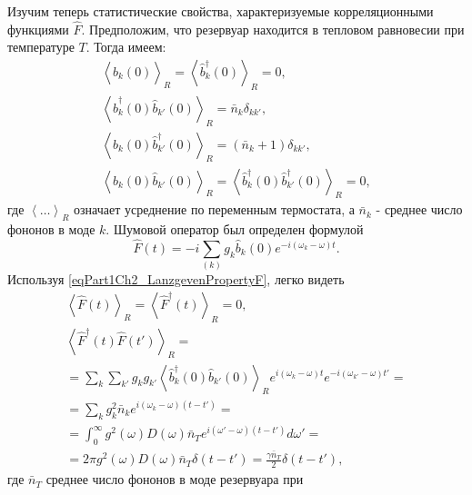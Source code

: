 Изучим теперь статистические свойства, характеризуемые корреляционными
функциями $\hat{F}$. Предположим, что резервуар находится в тепловом
равновесии при температуре $T$. Тогда имеем:
\begin{eqnarray}
\left<\hat{b}_k\left(0\right)\right>_R = 
\left<\hat{b}_k^{\dag}\left(0\right)\right>_R = 0, 
\nonumber \\
\left<\hat{b}_k^{\dag}\left(0\right)\hat{b}_{k'}\left(0\right)\right>_R = 
\bar{n}_k \delta_{k k'},
\nonumber \\
\left<\hat{b}_k\left(0\right)\hat{b}_{k'}^{\dag}\left(0\right)\right>_R = 
\left(\bar{n}_k + 1\right)\delta_{k k'},
\nonumber \\
\left<\hat{b}_k\left(0\right)\hat{b}_{k'}\left(0\right)\right>_R = 
\left<\hat{b}_k^{\dag}\left(0\right)\hat{b}_{k'}^{\dag}\left(0\right)\right>_R
= 0,
\label{eqPart1Ch2_LanzgevenPropertyF}
\end{eqnarray}
где $\left<\dots\right>_R$ означает усреднение по переменным
термостата, а $\bar{n}_k$ - среднее число фононов в моде $k$. Шумовой
оператор был определен формулой 
\begin{equation}
\hat{F}\left(t\right) = -i \sum_{(k)}g_k 
\hat{b}_k\left(0\right)
e^{-i \left(\omega_k - \omega\right)t}.
\label{eqPart1Ch2_LanzgevenDefenitionF}
\end{equation}
Используя \eqref{eqPart1Ch2_LanzgevenPropertyF}, легко видеть
\begin{eqnarray}
\left<\hat{F}\left(t\right)\right>_R =
\left<\hat{F}^{\dag}\left(t\right)\right>_R  = 0,
\nonumber \\
\left<\hat{F}^{\dag}\left(t\right)\hat{F}\left(t'\right)\right>_R = 
\nonumber \\
= \sum_{k}\sum_{k'}g_k g_{k'}
\left<\hat{b}_k^{\dag}\left(0\right)\hat{b}_{k'}\left(0\right)\right>_R 
e^{i\left(\omega_k - \omega\right)t} 
 e^{-i\left(\omega_{k'} - \omega\right)t'} =
\nonumber \\
= \sum_{k}g_k^2 \bar{n}_k 
e^{i\left(\omega_k - \omega\right)\left(t - t'\right)} = 
\nonumber \\
=
\int_0^\infty
g^2\left(\omega\right)D\left(\omega\right)\bar{n}_T
e^{i\left(\omega' - \omega\right)\left(t - t'\right)}d \omega' = 
\nonumber \\
= 2 \pi
g^2\left(\omega\right)D\left(\omega\right)\bar{n}_T
\delta\left(t - t'\right) =
\frac{\gamma \bar{n}_{T}}{2} \delta\left(t - t'\right),
\label{eqPart1Ch2_LanzgevenCorrelations}
\end{eqnarray}
где $\bar{n}_T$ среднее число фононов в моде резервуара при
